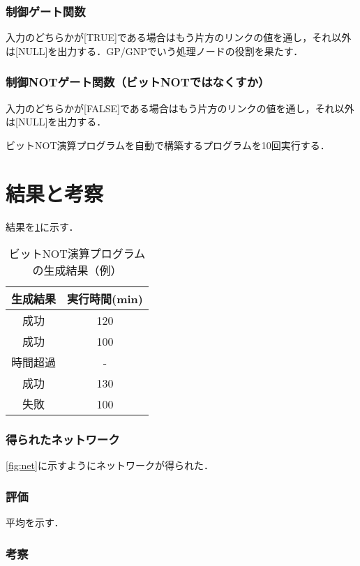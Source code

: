 \documentclass[exploratorypaper]{jsaiart} %
\begin{document}
\subsubsection{制御ゲート関数}
入力のどちらかが[TRUE]である場合はもう片方のリンクの値を通し，それ以外は[NULL]を出力する．GP/GNPでいう処理ノードの役割を果たす．
\subsubsection{制御NOTゲート関数（ビットNOTではなくすか）}
入力のどちらかが[FALSE]である場合はもう片方のリンクの値を通し，それ以外は[NULL]を出力する．


ビットNOT演算プログラムを自動で構築するプログラムを10回実行する．
\section{結果と考察}
結果を\ref{tbl:result}に示す．

\begin{table}[htbp]
\centering
\caption{ビットNOT演算プログラムの生成結果（例）}
\label{tbl:result}
\begin{tabular}{cc}
    \hline
     生成結果 & 実行時間(min) \\
    \hline
    成功 & 120 \\
    成功 & 100 \\
    時間超過 & - \\
    成功 & 130 \\
    失敗 & 100 \\
    \hline
\end{tabular}
\end{table}

\subsubsection{得られたネットワーク}
\ref{fig:net}に示すようにネットワークが得られた．
\subsubsection{評価}
平均を示す．
\subsubsection{考察}

\end{document}
